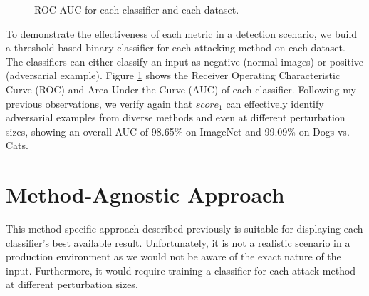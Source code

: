 \begin{figure}[htp]
    \caption{ROC-AUC for each classifier and each dataset.}
    \label{fig:rocs}
\end{figure}

To demonstrate the effectiveness of each metric in a detection scenario, we
build a threshold-based binary classifier for each attacking method on each
dataset. The classifiers can either classify an input as negative (normal
images) or positive (adversarial example). Figure \ref{fig:rocs} shows the
Receiver Operating Characteristic Curve (ROC) and Area Under the Curve (AUC) of
each classifier. Following my previous observations, we verify again that
$score_1$ can effectively identify adversarial examples from diverse methods and
even at different perturbation sizes, showing an overall AUC of 98.65\% on
ImageNet and 99.09\% on Dogs vs. Cats.

\section{Method-Agnostic Approach}
This method-specific approach described previously is suitable for displaying
each classifier's best available result. Unfortunately, it is not a realistic
scenario in a production environment as we would not be aware of the exact
nature of the input. Furthermore, it would require training a classifier for
each attack method at different perturbation sizes.

